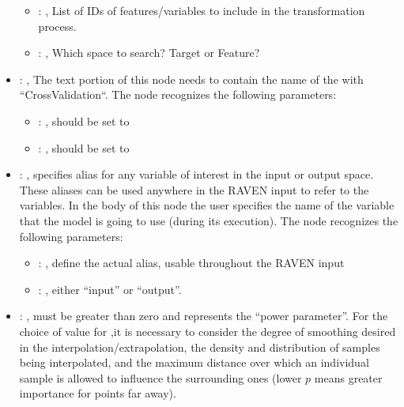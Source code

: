 \begin{itemize}
\begin{itemize}
        \item {}: ,
          List of IDs of features/variables to include in the transformation process.

        \item {}: ,
          Which space to search? Target or Feature?
      \end{itemize}

    \item {}: ,
      The text portion of this node needs to contain the name of the  with
               ``CrossValidation``.
      The  node recognizes the following parameters:
        \begin{itemize}
          \item {}: ,
            should be set to 
          \item {}: ,
            should be set to 
      \end{itemize}

    \item {}: ,
      specifies alias for         any variable of interest in the input or output space. These
      aliases can be used anywhere in the RAVEN input to         refer to the variables. In the body
      of this node the user specifies the name of the variable that the model is going to use
      (during its execution).
      The  node recognizes the following parameters:
        \begin{itemize}
          \item {}: ,
            define the actual alias, usable throughout the RAVEN input
          \item {}: ,
            either ``input'' or ``output''.
      \end{itemize}

    \item {}: ,
      must be greater than zero and represents the ``power parameter''.
      For the choice of value for ,it is necessary to consider the degree
      of smoothing desired in the interpolation/extrapolation, the density and
      distribution of samples being interpolated, and the maximum distance over
      which an individual sample is allowed to influence the surrounding ones (lower
      $p$ means greater importance for points far away).
  \end{itemize}

